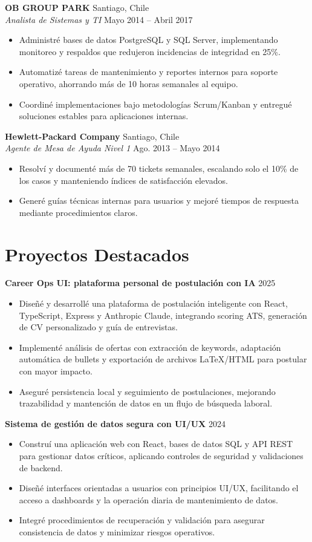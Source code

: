 \documentclass[11pt,letterpaper]{article}
\begin{document}
\textbf{OB GROUP PARK} \hfill Santiago, Chile\\
\textit{Analista de Sistemas y TI} \hfill Mayo 2014 -- Abril 2017
\begin{itemize}
  \item Administré bases de datos PostgreSQL y SQL Server, implementando monitoreo y respaldos que redujeron incidencias de integridad en 25\%.
  \item Automatizé tareas de mantenimiento y reportes internos para soporte operativo, ahorrando más de 10 horas semanales al equipo.
  \item Coordiné implementaciones bajo metodologías Scrum/Kanban y entregué soluciones estables para aplicaciones internas.
\end{itemize}

\textbf{Hewlett-Packard Company} \hfill Santiago, Chile\\
\textit{Agente de Mesa de Ayuda Nivel 1} \hfill Ago. 2013 -- Mayo 2014
\begin{itemize}
  \item Resolví y documenté más de 70 tickets semanales, escalando solo el 10\% de los casos y manteniendo índices de satisfacción elevados.
  \item Generé guías técnicas internas para usuarios y mejoré tiempos de respuesta mediante procedimientos claros.
\end{itemize}

\section{Proyectos Destacados}
\textbf{Career Ops UI: plataforma personal de postulación con IA} \hfill 2025
\begin{itemize}
  \item Diseñé y desarrollé una plataforma de postulación inteligente con React, TypeScript, Express y Anthropic Claude, integrando scoring ATS, generación de CV personalizado y guía de entrevistas.
  \item Implementé análisis de ofertas con extracción de keywords, adaptación automática de bullets y exportación de archivos LaTeX/HTML para postular con mayor impacto.
  \item Aseguré persistencia local y seguimiento de postulaciones, mejorando trazabilidad y mantención de datos en un flujo de búsqueda laboral.
\end{itemize}

\textbf{Sistema de gestión de datos segura con UI/UX} \hfill 2024
\begin{itemize}
  \item Construí una aplicación web con React, bases de datos SQL y API REST para gestionar datos críticos, aplicando controles de seguridad y validaciones de backend.
  \item Diseñé interfaces orientadas a usuarios con principios UI/UX, facilitando el acceso a dashboards y la operación diaria de mantenimiento de datos.
  \item Integré procedimientos de recuperación y validación para asegurar consistencia de datos y minimizar riesgos operativos.
\end{itemize}
\end{document}
